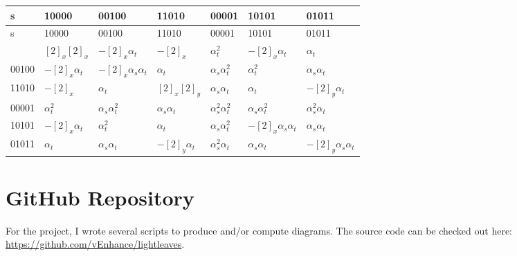 \begin{longtable}{|l||p{2.1cm}|p{2.1cm}|p{2.1cm}|p{2.1cm}|p{2.1cm}|p{2.1cm}|}
\hline
s & 10000 & 00100 & 11010 & 00001 & 10101 & 01011 \\ \hline
\endfirsthead
s & 10000 & 00100 & 11010 & 00001 & 10101 & 01011 \\ \hline
\endhead
\endfoot
\hline
\endlastfoot
10000
& $[2]_x[2]_x$ %
& $-[2]_x\alpha_t$ %
& $-[2]_x$ %
& $\alpha_t^2$ %
& $-[2]_x\alpha_t$ %
& $\alpha_t$ %
\\
00100
& $-[2]_x\alpha_t$ %
& $-[2]_x\alpha_s\alpha_t$ %
& $\alpha_t$ %
& $\alpha_s\alpha_t^2$ %
& $\alpha_t^2$ %
& $\alpha_s\alpha_t$ %
\\
11010
& $-[2]_x$ %
& $\alpha_t$ %
& $[2]_x[2]_y$ %
& $\alpha_s\alpha_t$ %
& $\alpha_t$ %
& $-[2]_y\alpha_t$ %
\\
00001
& $\alpha_t^2$ %
& $\alpha_s\alpha_t^2$ %
& $\alpha_s\alpha_t$ %
& $\alpha_s^2\alpha_t^2$ %
& $\alpha_s\alpha_t^2$ %
& $\alpha_s^2\alpha_t$ %
\\
10101
& $-[2]_x\alpha_t$ %
& $\alpha_t^2$ %
& $\alpha_t$ %
& $\alpha_s\alpha_t^2$ %
& $-[2]_x\alpha_s\alpha_t$ %
& $\alpha_s\alpha_t$ %
\\
01011
& $\alpha_t$ %
& $\alpha_s\alpha_t$ %
& $-[2]_y\alpha_t$ %
& $\alpha_s^2\alpha_t$ %
& $\alpha_s\alpha_t$ %
& $-[2]_y\alpha_s\alpha_t$ %
\\
\end{longtable}

\section{GitHub Repository}
For the project, I wrote several scripts to produce and/or compute diagrams.  The source code can be checked out here: \url{https://github.com/vEnhance/lightleaves}.
